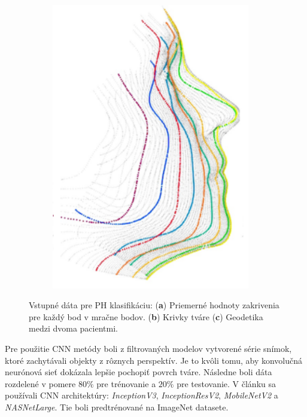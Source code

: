 \begin{figure}[h]
\begin{subfigure}[b]{0.32\textwidth}
		\includegraphics[width=0.95\textwidth]{figures/resers_c.png}
		\caption{}
		\label{fig:resers:c}
	\end{subfigure}
	\caption{Vstupné dáta pre PH klasifikáciu: (\textbf{a}) Priemerné hodnoty zakrivenia pre každý bod v mračne bodov. 
	(\textbf{b}) Krivky tváre
	(\textbf{c}) Geodetika medzi dvoma pacientmi. }
	\label{fig:resers:1}
\end{figure}

\newpage


Pre použitie CNN metódy boli z filtrovaných modelov vytvorené série snímok, ktoré zachytávali objekty z rôznych perspektív. Je to kvôli tomu, aby konvolučná neurónová sieť dokázala lepšie pochopiť povrch tváre. Následne boli dáta rozdelené v pomere $80\%$ pre trénovanie a $20\%$ pre testovanie. V článku sa používali CNN architektúry: \textit{InceptionV3}, \textit{InceptionResV2}, \textit{MobileNetV2} a \textit{NASNetLarge}. Tie boli predtrénované na ImageNet datasete. 

